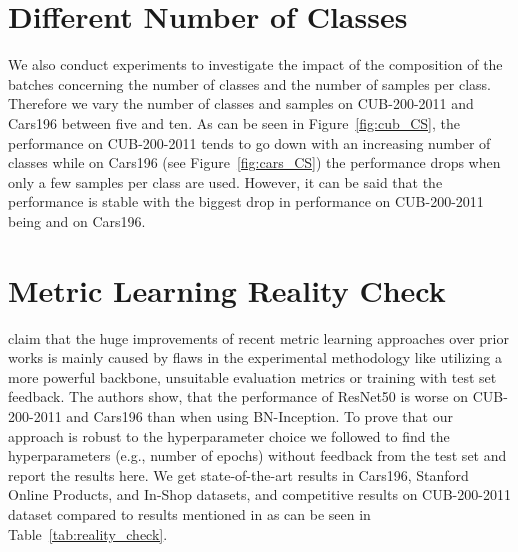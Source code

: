 \documentclass{article}
\begin{document}
\section{Different Number of Classes}
\label{sec:CS}
We also conduct experiments to investigate the impact of the composition of the batches concerning the number of classes and the number of samples per class. 
Therefore we vary the number of classes and samples on CUB-200-2011 and Cars196 between five and ten. As can be seen in Figure~\ref{fig:cub_CS}, the performance on CUB-200-2011 tends to go down with an increasing number of classes while on Cars196 (see Figure~\ref{fig:cars_CS}) the performance drops when only a few samples per class are used. However, it can be said that the performance is stable with the biggest drop in performance on CUB-200-2011 being  and  on Cars196.

\vspace{-0.1cm}
\section{Metric Learning Reality Check}
\label{sec:Reality_Check}
\cite{DBLP:conf/eccv/MusgraveBL20} claim that the huge improvements of recent metric learning approaches over prior works is mainly caused by flaws in the experimental methodology like utilizing a more powerful backbone, unsuitable evaluation metrics or training with test set feedback. The authors show, that the performance of ResNet50 is worse on CUB-200-2011 and Cars196 than when using BN-Inception. To prove that our approach is robust to the hyperparameter choice we followed \cite{DBLP:conf/eccv/MusgraveBL20}  to find the hyperparameters (e.g., number of epochs) without feedback from the test set and report the results here. We get state-of-the-art results in Cars196, Stanford Online Products, and In-Shop datasets, and competitive results on CUB-200-2011 dataset compared to results mentioned in \cite{DBLP:conf/eccv/MusgraveBL20} as can be seen in Table~\ref{tab:reality_check}.

\begin{table}
\centering
{}
\caption{Performance of our approach following \cite{DBLP:conf/eccv/MusgraveBL20} to find the hyperparameters (e.g., number of epochs) without feedback from the test set.}
\label{tab:reality_check}
\end{table} \vspace{-0.2cm}
\end{document}
